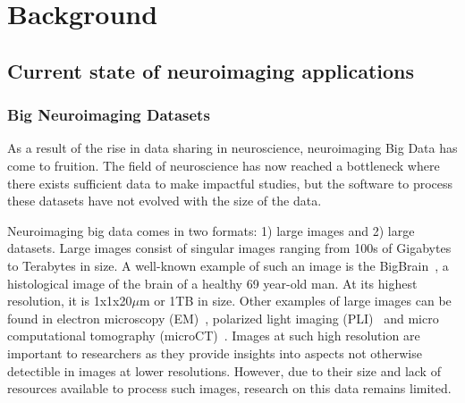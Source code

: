 
    
    \chapter{Background} 
    \section{Current state of neuroimaging applications}
        

        \subsection{Big Neuroimaging Datasets}\label{datasets}

            As a result of the rise in data sharing in neuroscience,
            neuroimaging Big Data has come to fruition. The field of
            neuroscience has now reached a bottleneck where there exists
            sufficient data to make impactful studies, but the software to
            process these datasets have not evolved with the size of the data.

            Neuroimaging big data comes in two formats: 1) large images and 2)
            large datasets. Large images consist of singular images ranging from
            100s of Gigabytes to Terabytes in size. A well-known example of such
            an image is the BigBrain~\cite{Amunts1472}, a histological image of
            the brain of a healthy 69 year-old man. At its highest resolution,
            it is 1x1x20$\mu$m or 1TB in size. Other examples of large images
            can be found in electron microscopy (EM)~\cite{Hildebrand:2017aa},
            polarized light imaging (PLI)~\cite{10.1007/978-3-319-12084-3_1} and
            micro computational tomography
            (microCT)~\cite{10.1371/journal.pone.0035691}. Images at such high
            resolution are important to researchers as they provide insights
            into aspects not otherwise detectible in images at lower
            resolutions. However, due to their size and lack of resources
            available to process such images, research on this data remains
            limited.

